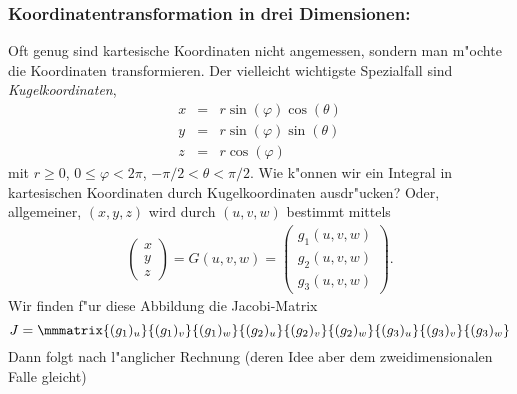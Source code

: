 \subsubsection{Koordinatentransformation in drei Dimensionen:}\par
 Oft genug sind kartesische Koordinaten nicht angemessen, sondern man m"ochte 
 die Koordinaten  transformieren. Der vielleicht wichtigste Spezialfall sind 
 \emph{Kugelkoordinaten}, 
 \begin{eqnarray*}
 x & = & r\sin(\varphi)\cos(\theta)\\ 
 y & = & r\sin(\varphi)\sin(\theta)\\ 
 z & = & r \cos(\varphi)
 \end{eqnarray*}
 mit $r\geq 0$, $0\leq \varphi < 2\pi$, $-\pi/2 < \theta < \pi/2$.
 Wie k"onnen wir ein Integral in kartesischen Koordinaten durch Kugelkoordinaten 
 ausdr"ucken? Oder, allgemeiner, $(x,y,z)$ wird durch $(u,v,w)$ bestimmt mittels
 \begin{eqnarray*}
\left(\begin{array}{c} x\\ y\\ z\end{array}\right)
= G(u,v,w) 
= 
\left(\begin{array}{c}
 g_1(u,v,w)\\
 g_2(u,v,w)\\
 g_3(u,v,w)
 \end{array}\right).
 \end{eqnarray*}
Wir finden f"ur diese Abbildung 
die Jacobi-Matrix
$$ J =  \mmmatrix{(g_{1})_u}{(g_{1})_v}{(g_1)_w}   {(g_2)_u}{(g_2)_v}{(g_2)_w}   {(g_3)_u}{(g_3)_v}{(g_3)_w}
$$
Dann folgt nach l"anglicher Rechnung (deren Idee aber dem zweidimensionalen Falle gleicht)\par
{}
